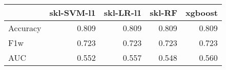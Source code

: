 \begin{tabular}{lrrrr}
\toprule
{} &  skl-SVM-l1 &  skl-LR-l1 &  skl-RF &  xgboost \\
\midrule
Accuracy &       0.809 &      0.809 &   0.809 &    0.809 \\
F1w      &       0.723 &      0.723 &   0.723 &    0.723 \\
AUC      &       0.552 &      0.557 &   0.548 &    0.560 \\
\bottomrule
\end{tabular}
